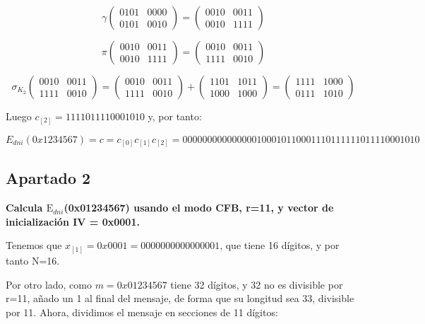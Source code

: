 \documentclass[a4paper]{article}
\begin{document}
$$\gamma \begin{pmatrix} 0101 & 0000 \\ 0101 & 0010 \end{pmatrix} = \begin{pmatrix} 0010 & 0011 \\ 0010 & 1111 \end{pmatrix}$$

$$\pi \begin{pmatrix} 0010 & 0011 \\ 0010 & 1111 \end{pmatrix} = \begin{pmatrix} 0010 & 0011 \\ 1111 & 0010 \end{pmatrix}$$

$$\sigma_{K_2} \begin{pmatrix} 0010 & 0011 \\ 1111 & 0010 \end{pmatrix} = \begin{pmatrix} 0010 & 0011 \\ 1111 & 0010 \end{pmatrix} + \begin{pmatrix} 1101 & 1011 \\ 1000 & 1000 \end{pmatrix} = \begin{pmatrix} 1111 & 1000 \\ 0111 & 1010 \end{pmatrix}$$

Luego $c_{[2]} = 1111 0111 1000 1010$ y, por tanto:

$$E_{dni}(0x1234567) = c = c_{[0]}c_{[1]}c_{[2]} = 0000 0000 0000 0001 0001 0110 0011 1011 1111 0111 1000 1010$$




\subsection{Apartado 2}
\textbf{Calcula $\text{E}_{dni}$(0x01234567) usando el modo CFB, r=11, y
vector de inicialización IV = 0x0001.}

Tenemos que $x_{[1]} = 0x0001=0000 0000 0000 0001$, que tiene 16 dígitos, y por tanto N=16.

Por otro lado, como $m=0x01234567$ tiene 32 dígitos, y 32 no es divisible por r=11, añado un 1 al final del mensaje, de forma que su longitud sea 33, divisible por 11. Ahora, dividimos el mensaje en secciones de 11 dígitos:
\end{document}
